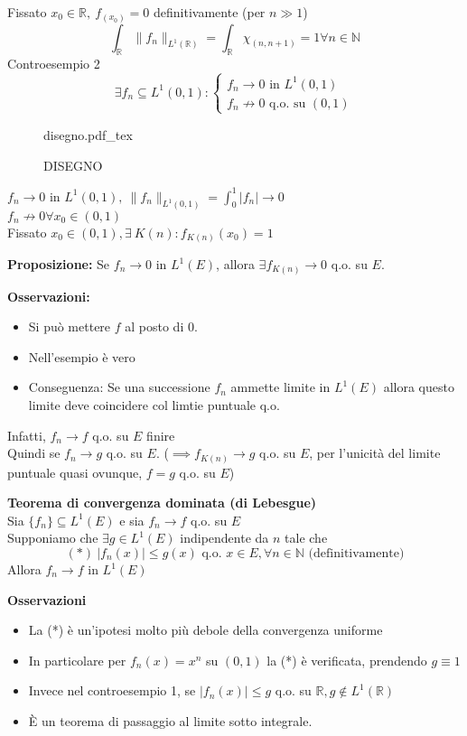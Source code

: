 \documentclass[a4paper]{article}
\newcommand{\incfig}[1]{%
	\def\svgwidth{\columnwidth}
	{#1.pdf_tex}
}
\newcommand{\R}{\mathbb{R}}
\newcommand{\N}{\mathbb{N}}
\begin{document}
Fissato $x_0\in\R,\ f_(x_0)=0$ definitivamente (per $n\gg 1$)
\[\int_{\R}^{} \|f_n\|_{L^1(\R)}=\int_{\R}^{} \chi_{(n,n+1)}=1 \forall n\in\N\]
Controesempio 2
\[\exists f_n \subseteq L^1(0,1): \begin{cases}
	f_n\to 0 \text{ in }L^1(0,1)\\
	f_n \not\to 0\text{ q.o. su }(0,1)
\end{cases} 
\]
\begin{figure}[ht]
    \centering
    \incfig{disegno}
    \caption{DISEGNO}
    \label{fig:disegno}
\end{figure}
$f_n\to 0$ in $L^1(0,1), \ \|f_n\|_{L^1(0,1)}=\int_{0}^{1} |f_n|\to 0 $
\\$f_n\not\to 0\forall x_0\in(0,1)$
\\Fissato $x_0\in(0,1), \exists\  K(n):f_{K(n)}(x_0)=1$ 
\begin{tcolorbox}
	\textbf{Proposizione:} Se $f_n\to 0$ in $L^1(E)$, allora $\exists f_{K(n)}\to 0$ q.o. su $E$.
\end{tcolorbox}
\textbf{Osservazioni:} 
\begin{itemize}
	\item Si può mettere $f$ al posto di 0.
	\item Nell'esempio è vero
	\item Conseguenza: Se una successione $f_n$ ammette limite in $L^1(E)$ allora questo limite deve coincidere col limtie puntuale q.o. 
\end{itemize}
Infatti, $f_n\to f$ q.o. su $E$  finire
\\Quindi se $f_n\to g$ q.o. su $E$. ($\implies f_{K(n)}\to g$ q.o. su $E$, per l'unicità del limite puntuale quasi ovunque, $f=g$ q.o. su $E$)
\begin{tcolorbox}
	\textbf{Teorema di convergenza dominata (di Lebesgue)}
	\\Sia $\{f_n\} \subseteq  L^1(E)$ e sia $f_n\to f$ q.o. su $E$\\
	Supponiamo che $\exists g\in L^1(E)$ indipendente da $n$ tale che
	\[(*)\ |f_n(x)|\le g(x)\text{ q.o. }x\in E, \forall n \in \N\text{ (definitivamente)}\]
	Allora $f_n\to f$ in $L^1(E)$
\end{tcolorbox}
\textbf{Osservazioni}
\begin{itemize}
	\item La (*) è un'ipotesi molto più debole della convergenza uniforme
	\item In particolare per $f_n(x)=x^n$ su $(0,1)$ la (*) è verificata, prendendo $g\equiv 1$
	\item Invece nel controesempio 1, se $|f_n(x)|\le g$ q.o. su $\R,g \not\in L^1(\R)$
	\item È un teorema di passaggio al limite sotto integrale.
\end{itemize}
\end{document}
